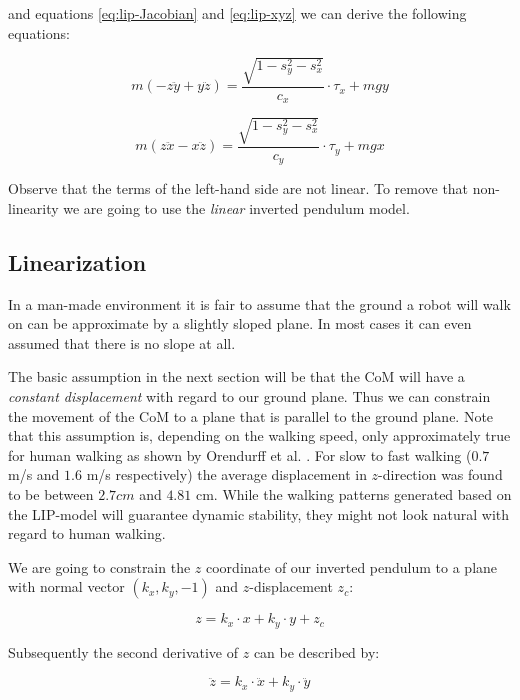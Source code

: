 \documentclass[english,ngerman]{KITreprt}
\begin{document}
and equations \ref{eq:lip-Jacobian} and \ref{eq:lip-xyz} we can derive
the following equations:

\begin{equation} \label{eq:lip-dyn-y}
m(-z\ddot{y} + y\ddot{z}) = \frac{\sqrt{1 - s_y^2 - s_x^2}}{c_x} \cdot \tau_x + m g y
\end{equation}

\begin{equation} \label{eq:lip-dyn-x}
m(z\ddot{x} - x\ddot{z}) = \frac{\sqrt{1 - s_y^2 - s_x^2}}{c_y} \cdot \tau_y + m g x
\end{equation}

Observe that the terms of the left-hand side are not linear. To remove
that non-linearity we are going to use the \emph{linear} inverted
pendulum model.

\subsection{Linearization}\label{linearization}

In a man-made environment it is fair to assume that the ground a robot
will walk on can be approximate by a slightly sloped plane. In most
cases it can even assumed that there is no slope at all.

The basic assumption in the next section will be that the CoM will have
a \emph{constant displacement} with regard to our ground plane. Thus we
can constrain the movement of the CoM to a plane that is parallel to the
ground plane. Note that this assumption is, depending on the walking
speed, only approximately true for human walking as shown by Orendurff
et al. \citep{orendurff2004effect}. For slow to fast walking ($0.7$ m/s
and $1.6$ m/s respectively) the average displacement in $z$-direction
was found to be between $2.7cm$ and $4.81$ cm. While the walking
patterns generated based on the LIP-model will guarantee dynamic
stability, they might not look natural with regard to human walking.

We are going to constrain the $z$ coordinate of our inverted pendulum to
a plane with normal vector $(k_x, k_y, -1)$ and $z$-displacement $z_c$:

\begin{equation} \label{eq:lip-z-plane}
z = k_x \cdot x + k_y \cdot y + z_c
\end{equation}

Subsequently the second derivative of $z$ can be described by:

\begin{equation} \label{eq:lip-z-div}
\ddot{z} = k_x \cdot \ddot{x} + k_y \cdot \ddot{y}
\end{equation}
\end{document}
